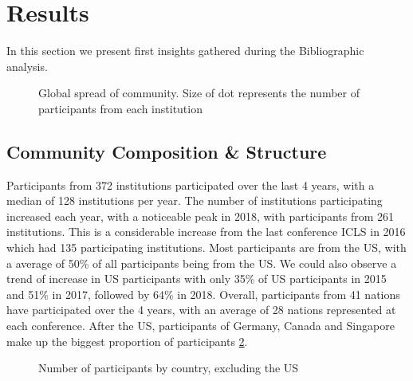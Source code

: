 \documentclass[article,twocolumn]{IEEEtran}
\begin{document}
    \hypertarget{results}{%
\section{Results}\label{results}}

In this section we present first insights gathered during the
Bibliographic analysis.



    \begin{figure}
        \begin{center}\end{center}
        \caption{Global spread of community. Size of dot represents the number of participants from each institution}
        \label{global_com}
    \end{figure}
    
    \hypertarget{community-composition-structure}{%
\subsection{Community Composition \&
Structure}\label{community-composition-structure}}

Participants from 372 institutions participated over the last 4 years,
with a median of 128 institutions per year. The number of institutions
participating increased each year, with a noticeable peak in 2018, with
participants from 261 institutions. This is a considerable increase from
the last conference ICLS in 2016 which had 135 participating
institutions. Most participants are from the US, with a average of 50\%
of all participants being from the US. We could also observe a trend of
increase in US participants with only 35\% of US participants in 2015
and 51\% in 2017, followed by 64\% in 2018. Overall, participants from
41 nations have participated over the 4 years, with an average of 28
nations represented at each conference. After the US, participants of
Germany, Canada and Singapore make up the biggest proportion of
participants \ref{figrep}.


    \begin{figure}
        \begin{center}\end{center}
        \caption{Number of participants by country, excluding the US}
        \label{figrep}
    \end{figure}
    
\end{document}
